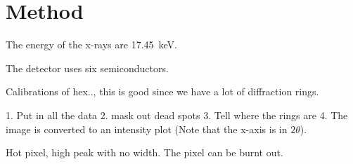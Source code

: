 \section{Method}
The energy of the x-rays are \SI{17.45}{\kilo\electronvolt}. 

The detector uses six semiconductors. 

Calibrations of hex.., this is good since we have a lot of diffraction rings.  

1. Put in all the data
2. mask out dead spots
3. Tell where the rings are 
4. The image is converted to an intensity plot (Note that the x-axis is in $2\theta$). 


Hot pixel, high peak with no width. The pixel can be burnt out. 
